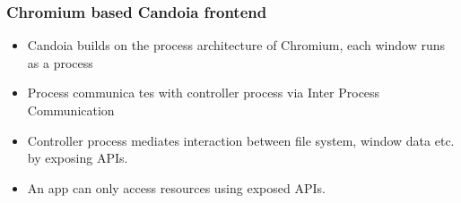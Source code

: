         \begin{frame}
            \frametitle{Chromium based Candoia frontend}
            \begin{itemize}
                \item Candoia builds on the process architecture of Chromium, each window runs as a process
                \item Process communica tes with controller process via Inter Process Communication
                \item Controller process mediates interaction between file system, window data etc. by exposing APIs.
                \item An app can only access resources using exposed APIs.
            \end{itemize}
         \end{frame}
